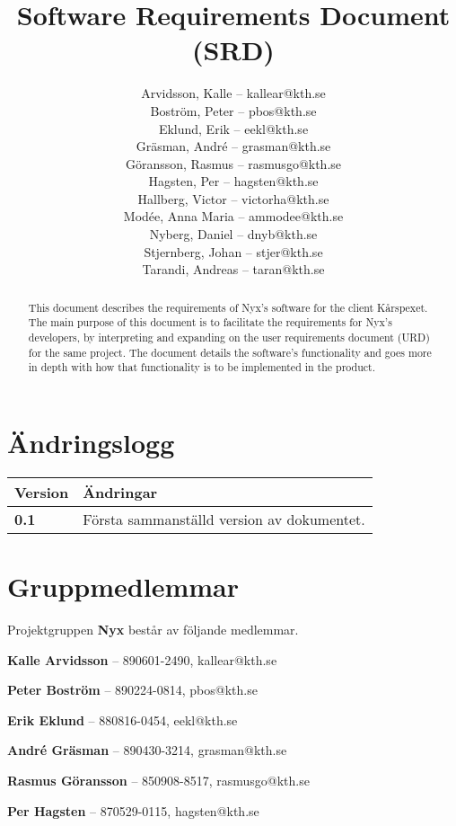\documentclass[a4paper, twoside, 11pt, titlepage]{article}
\author{
	\small
	Arvidsson, Kalle -- kallear@kth.se\\
	Boström, Peter -- pbos@kth.se\\
	Eklund, Erik -- eekl@kth.se\\
	Gräsman, André -- grasman@kth.se\\
	Göransson, Rasmus -- rasmusgo@kth.se\\
	Hagsten, Per -- hagsten@kth.se\\
	Hallberg, Victor -- victorha@kth.se\\
	Modée, Anna Maria -- ammodee@kth.se\\
	Nyberg, Daniel -- dnyb@kth.se\\
	Stjernberg, Johan -- stjer@kth.se\\
	Tarandi, Andreas -- taran@kth.se
	}
\title{Software Requirements Document (SRD)}
\begin{document}
\maketitle

\clearpage
\thispagestyle{empty}
\mbox{}
\newpage

\begin{abstract}
	This document describes the requirements of Nyx's software for the client Kårspexet. The main purpose of this document is to facilitate the requirements for Nyx's developers, by interpreting and expanding on the user requirements document (URD) for the same project. The document details the software's functionality and goes more in depth with how that functionality is to be implemented in the product.
\end{abstract}

\newpage

\setcounter{page}{1}

\startfooter

\clearpage
\section*{Ändringslogg}


\begin{tabular} { p{2.6cm} p{12.5cm} }
	\hline
	\sffamily\textbf{Version} & \sffamily\textbf{Ändringar } \\
	\hline
	\sffamily\textbf{0.1} & Första sammanställd version av dokumentet.  \\
	\hline
\end{tabular}


\clearpage
\section*{Gruppmedlemmar}


Projektgruppen \textbf{Nyx} består av följande medlemmar.

\textbf{Kalle Arvidsson} -- 890601-2490, kallear@kth.se

\textbf{Peter Boström} -- 890224-0814, pbos@kth.se

\textbf{Erik Eklund} -- 880816-0454, eekl@kth.se 

\textbf{André Gräsman} -- 890430-3214, grasman@kth.se 

\textbf{Rasmus Göransson} -- 850908-8517, rasmusgo@kth.se 

\textbf{Per Hagsten} -- 870529-0115, hagsten@kth.se
\end{document}
